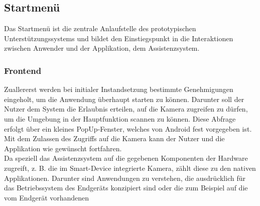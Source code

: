 \subsection{Startmenü}
Das Startmenü ist die zentrale Anlaufstelle des prototypischen Unterstützungssystems und bildet den Einstiegspunkt in die Interaktionen zwischen Anwender 
und der Applikation, dem Assistenzsystem.
\subsubsection{Frontend}
Zuallererst werden bei initialer Instandsetzung bestimmte Genehmigungen eingeholt, um die Anwendung überhaupt starten zu können. Darunter soll der Nutzer dem System 
die Erlaubnis erteilen, auf die Kamera zugreifen zu dürfen, um die Umgebung in der Hauptfunktion scannen zu können. %
Diese Abfrage erfolgt über ein kleines PopUp-Fenster, welches von Android fest vorgegeben ist. %
Mit dem Zulassen des Zugriffs auf die Kamera kann der Nutzer und die Applikation wie gewünscht fortfahren. %
\\ 
\linebreak
Da speziell das Assistenzsystem auf die gegebenen Komponenten der Hardware zugreift, z. B. die im Smart-Device integrierte Kamera, zählt diese zu den nativen Applikationen. 
Darunter sind Anwendungen zu verstehen, die ausdrücklich für das Betriebssystem des Endgeräts konzipiert sind oder die zum Beispiel auf die vom Endgerät vorhandenen 
